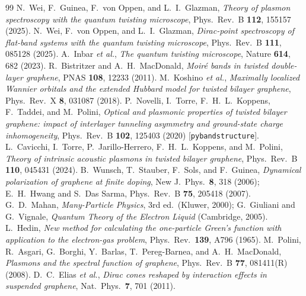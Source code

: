 \documentclass[11pt,a4paper]{article}
\theoremstyle{remark}
\begin{document}
\begin{thebibliography}{99}
 N.~Wei, F.~Guinea, F.~von Oppen, and L.~I.~Glazman, \emph{Theory of plasmon spectroscopy with the quantum twisting microscope}, Phys.~Rev.~B \textbf{112}, 155157 (2025).
 N.~Wei, F.~von Oppen, and L.~I.~Glazman, \emph{Dirac-point spectroscopy of flat-band systems with the quantum twisting microscope}, Phys.~Rev.~B \textbf{111}, 085128 (2025).
 A.~Inbar \emph{et al.}, \emph{The quantum twisting microscope}, Nature \textbf{614}, 682 (2023).
 R.~Bistritzer and A.~H.~MacDonald, \emph{Moir\'e bands in twisted double-layer graphene}, PNAS \textbf{108}, 12233 (2011).
 M.~Koshino \emph{et al.}, \emph{Maximally localized Wannier orbitals and the extended Hubbard model for twisted bilayer graphene}, Phys.~Rev.~X \textbf{8}, 031087 (2018).
 P.~Novelli, I.~Torre, F.~H.~L.~Koppens, F.~Taddei, and M.~Polini, \emph{Optical and plasmonic properties of twisted bilayer graphene: impact of interlayer tunneling asymmetry and ground-state charge inhomogeneity}, Phys.~Rev.~B \textbf{102}, 125403 (2020) [\texttt{pybandstructure}].
 L.~Cavicchi, I.~Torre, P.~Jarillo-Herrero, F.~H.~L.~Koppens, and M.~Polini, \emph{Theory of intrinsic acoustic plasmons in twisted bilayer graphene}, Phys.~Rev.~B \textbf{110}, 045431 (2024).
 B.~Wunsch, T.~Stauber, F.~Sols, and F.~Guinea, \emph{Dynamical polarization of graphene at finite doping}, New J.~Phys.~\textbf{8}, 318 (2006); E.~H.~Hwang and S.~Das Sarma, Phys.~Rev.~B \textbf{75}, 205418 (2007).
 G.~D.~Mahan, \emph{Many-Particle Physics}, 3rd ed.\ (Kluwer, 2000); G.~Giuliani and G.~Vignale, \emph{Quantum Theory of the Electron Liquid} (Cambridge, 2005).
 L.~Hedin, \emph{New method for calculating the one-particle Green's function with application to the electron-gas problem}, Phys.~Rev.~\textbf{139}, A796 (1965).
 M.~Polini, R.~Asgari, G.~Borghi, Y.~Barlas, T.~Pereg-Barnea, and A.~H.~MacDonald, \emph{Plasmons and the spectral function of graphene}, Phys.~Rev.~B \textbf{77}, 081411(R) (2008).
 D.~C.~Elias \emph{et al.}, \emph{Dirac cones reshaped by interaction effects in suspended graphene}, Nat.~Phys.~\textbf{7}, 701 (2011).
\end{thebibliography}
\end{document}
